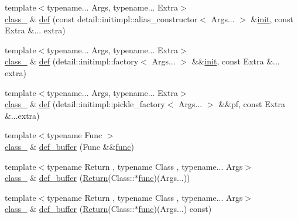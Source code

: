 \begin{DoxyCompactItemize}
\item 
{\footnotesize template$<$typename... Args, typename... Extra$>$ }\\\mbox{\hyperlink{classclass__}{class\+\_\+}} \& \mbox{\hyperlink{classclass___aebf24734236ad776f18819d03c6b0e14}{def}} (const detail\+::initimpl\+::alias\+\_\+constructor$<$ Args... $>$ \&\mbox{\hyperlink{pybind11_8h_a144961765ca31801e21d87651871934c}{init}}, const Extra \&... extra)
\item 
{\footnotesize template$<$typename... Args, typename... Extra$>$ }\\\mbox{\hyperlink{classclass__}{class\+\_\+}} \& \mbox{\hyperlink{classclass___ae0c7a19e6e278ec165edcfb60671b71f}{def}} (detail\+::initimpl\+::factory$<$ Args... $>$ \&\&\mbox{\hyperlink{pybind11_8h_a144961765ca31801e21d87651871934c}{init}}, const Extra \&... extra)
\item 
{\footnotesize template$<$typename... Args, typename... Extra$>$ }\\\mbox{\hyperlink{classclass__}{class\+\_\+}} \& \mbox{\hyperlink{classclass___a872d4b21283515f794739264673cd2d8}{def}} (detail\+::initimpl\+::pickle\+\_\+factory$<$ Args... $>$ \&\&pf, const Extra \&...extra)
\item 
{\footnotesize template$<$typename Func $>$ }\\\mbox{\hyperlink{classclass__}{class\+\_\+}} \& \mbox{\hyperlink{classclass___acbd135c9fd33010bc99085e5d333bf55}{def\+\_\+buffer}} (Func \&\&\mbox{\hyperlink{_s_d_l__opengl__glext_8h_a18ae3ab36a07e388833b568cfdfa90c8}{func}})
\item 
{\footnotesize template$<$typename Return , typename Class , typename... Args$>$ }\\\mbox{\hyperlink{classclass__}{class\+\_\+}} \& \mbox{\hyperlink{classclass___a13babe9644a320b11f55d4c737780397}{def\+\_\+buffer}} (\mbox{\hyperlink{_python-ast_8h_abdae7f49d66ce8e500825bb53aa14901}{Return}}(Class\+::$\ast$\mbox{\hyperlink{_s_d_l__opengl__glext_8h_a18ae3ab36a07e388833b568cfdfa90c8}{func}})(Args...))
\item 
{\footnotesize template$<$typename Return , typename Class , typename... Args$>$ }\\\mbox{\hyperlink{classclass__}{class\+\_\+}} \& \mbox{\hyperlink{classclass___a96ca3406293a4a91090f419590358cd0}{def\+\_\+buffer}} (\mbox{\hyperlink{_python-ast_8h_abdae7f49d66ce8e500825bb53aa14901}{Return}}(Class\+::$\ast$\mbox{\hyperlink{_s_d_l__opengl__glext_8h_a18ae3ab36a07e388833b568cfdfa90c8}{func}})(Args...) const)
\item 

\end{DoxyCompactItemize}
